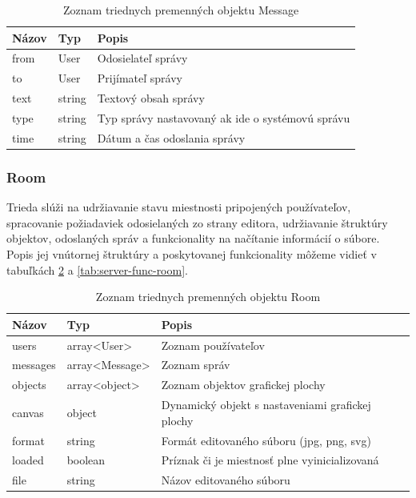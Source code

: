 \begin{table}
	\begin{tabular}{ | m{3cm} | m{3cm}| m{6.5cm} | } \hline
		\textbf{Názov} & \textbf{Typ} & \textbf{Popis} \\ \hline
		
		from & User & Odosielateľ správy \\\hline
		to & User & Prijímateľ správy \\\hline
		text & string & Textový obsah správy \\\hline
		type & string & Typ správy nastavovaný ak ide o systémovú správu \\\hline
		time & string & Dátum a čas odoslania správy \\	\hline
	
		\hline
	\end{tabular}
	\caption{Zoznam triednych premenných objektu Message}
	\label{tab:server-prop-message}
\end{table}



\subsubsection{Room}
Trieda  slúži na udržiavanie stavu miestnosti pripojených používateľov, spracovanie požiadaviek odosielaných zo strany editora, udržiavanie štruktúry objektov, odoslaných správ a funkcionality na načítanie informácií o súbore. Popis jej vnútornej štruktúry a poskytovanej funkcionality môžeme vidieť v tabuľkách \ref{tab:server-prop-room} a \ref{tab:server-func-room}.

\begin{table}
	\begin{tabular}{ | m{3cm} | m{3cm}| m{6.5cm} | } \hline
		\textbf{Názov} & \textbf{Typ} & \textbf{Popis} \\ \hline
	
		users & array<User> & Zoznam používateľov \\\hline
		messages & array<Message> & Zoznam správ \\\hline
		objects & array<object> & Zoznam objektov grafickej plochy \\\hline
		canvas & object & Dynamický objekt s nastaveniami grafickej plochy \\\hline
		format & string & Formát editovaného súboru (jpg, png, svg)\\\hline
		loaded & boolean & Príznak či je miestnosť plne vyinicializovaná \\\hline
		file & string & Názov editovaného súboru \\\hline
	
		\hline
	\end{tabular}
	\caption{Zoznam triednych premenných objektu Room}
	\label{tab:server-prop-room}
\end{table}


